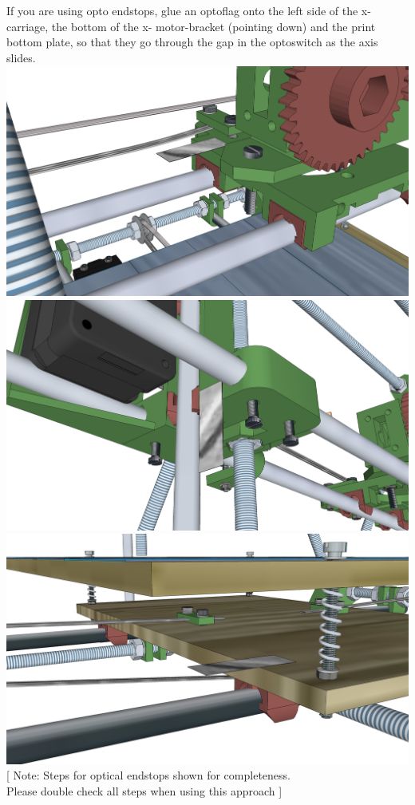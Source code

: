 \documentclass[twoside,a4paper,titlepage]{memoir}
\begin{document}
	\section{}
	If you are using opto endstops, glue an optoflag onto the left side of the x-carriage, the bottom of the x-
	motor-bracket (pointing down) and the print bottom plate, so that they go through the gap in the
	optoswitch as the axis slides.\\
	\includegraphics[width=1\linewidth]{graphics/ch10_6_1.png}
	\includegraphics[width=1\linewidth]{graphics/ch10_6_2.png}
	\includegraphics[width=1\linewidth]{graphics/ch10_6_3.png}	
	[ Note: Steps for optical endstops shown for completeness. \\
	Please double check all steps when using this approach ]
	
\end{document}
